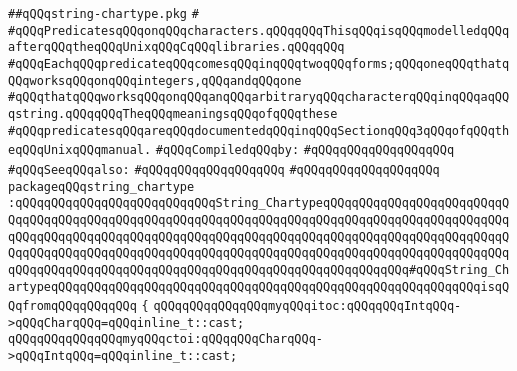 \label{src/lib/std/src/string-chartype.pkg}
\verb|##qQQqstring-chartype.pkg|\newline
\verb|#|\newline
\verb|#qQQqPredicatesqQQqonqQQqcharacters.qQQqqQQqThisqQQqisqQQqmodelledqQQqafterqQQqtheqQQqUnixqQQqCqQQqlibraries.qQQqqQQq|\newline
\verb|#qQQqEachqQQqpredicateqQQqcomesqQQqinqQQqtwoqQQqforms;qQQqoneqQQqthatqQQqworksqQQqonqQQqintegers,qQQqandqQQqone|\newline
\verb|#qQQqthatqQQqworksqQQqonqQQqanqQQqarbitraryqQQqcharacterqQQqinqQQqaqQQqstring.qQQqqQQqTheqQQqmeaningsqQQqofqQQqthese|\newline
\verb|#qQQqpredicatesqQQqareqQQqdocumentedqQQqinqQQqSectionqQQq3qQQqofqQQqtheqQQqUnixqQQqmanual.|\newline
\newline
\verb|#qQQqCompiledqQQqby:|\newline
\verb|#qQQqqQQqqQQqqQQqqQQq|\newline
\newline
\verb|#qQQqSeeqQQqalso:|\newline
\verb|#qQQqqQQqqQQqqQQqqQQq|\newline
\verb|#qQQqqQQqqQQqqQQqqQQq|\newline
\newline
\newline
\newline
\verb|packageqQQqstring_chartype|\newline
\verb|:qQQqqQQqqQQqqQQqqQQqqQQqqQQqString_ChartypeqQQqqQQqqQQqqQQqqQQqqQQqqQQqqQQqqQQqqQQqqQQqqQQqqQQqqQQqqQQqqQQqqQQqqQQqqQQqqQQqqQQqqQQqqQQqqQQqqQQqqQQqqQQqqQQqqQQqqQQqqQQqqQQqqQQqqQQqqQQqqQQqqQQqqQQqqQQqqQQqqQQqqQQqqQQqqQQqqQQqqQQqqQQqqQQqqQQqqQQqqQQqqQQqqQQqqQQqqQQqqQQqqQQqqQQqqQQqqQQqqQQqqQQqqQQqqQQqqQQqqQQqqQQqqQQqqQQqqQQqqQQqqQQqqQQq#qQQqString_ChartypeqQQqqQQqqQQqqQQqqQQqqQQqqQQqqQQqqQQqqQQqqQQqqQQqqQQqqQQqqQQqisqQQqfromqQQqqQQqqQQq|\newline
\verb|{|\newline
\verb|qQQqqQQqqQQqqQQqmyqQQqitoc:qQQqqQQqIntqQQq->qQQqCharqQQq=qQQqinline_t::cast;|\newline
\verb|qQQqqQQqqQQqqQQqmyqQQqctoi:qQQqqQQqCharqQQq->qQQqIntqQQq=qQQqinline_t::cast;|\newline
